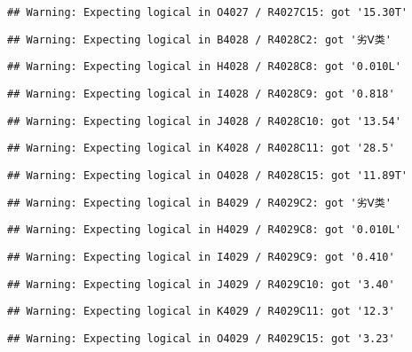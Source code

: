 \documentclass[
]{article}
\begin{document}
\begin{verbatim}
## Warning: Expecting logical in O4027 / R4027C15: got '15.30T'
\end{verbatim}

\begin{verbatim}
## Warning: Expecting logical in B4028 / R4028C2: got '劣Ⅴ类'
\end{verbatim}

\begin{verbatim}
## Warning: Expecting logical in H4028 / R4028C8: got '0.010L'
\end{verbatim}

\begin{verbatim}
## Warning: Expecting logical in I4028 / R4028C9: got '0.818'
\end{verbatim}

\begin{verbatim}
## Warning: Expecting logical in J4028 / R4028C10: got '13.54'
\end{verbatim}

\begin{verbatim}
## Warning: Expecting logical in K4028 / R4028C11: got '28.5'
\end{verbatim}

\begin{verbatim}
## Warning: Expecting logical in O4028 / R4028C15: got '11.89T'
\end{verbatim}

\begin{verbatim}
## Warning: Expecting logical in B4029 / R4029C2: got '劣Ⅴ类'
\end{verbatim}

\begin{verbatim}
## Warning: Expecting logical in H4029 / R4029C8: got '0.010L'
\end{verbatim}

\begin{verbatim}
## Warning: Expecting logical in I4029 / R4029C9: got '0.410'
\end{verbatim}

\begin{verbatim}
## Warning: Expecting logical in J4029 / R4029C10: got '3.40'
\end{verbatim}

\begin{verbatim}
## Warning: Expecting logical in K4029 / R4029C11: got '12.3'
\end{verbatim}

\begin{verbatim}
## Warning: Expecting logical in O4029 / R4029C15: got '3.23'
\end{verbatim}
\end{document}
